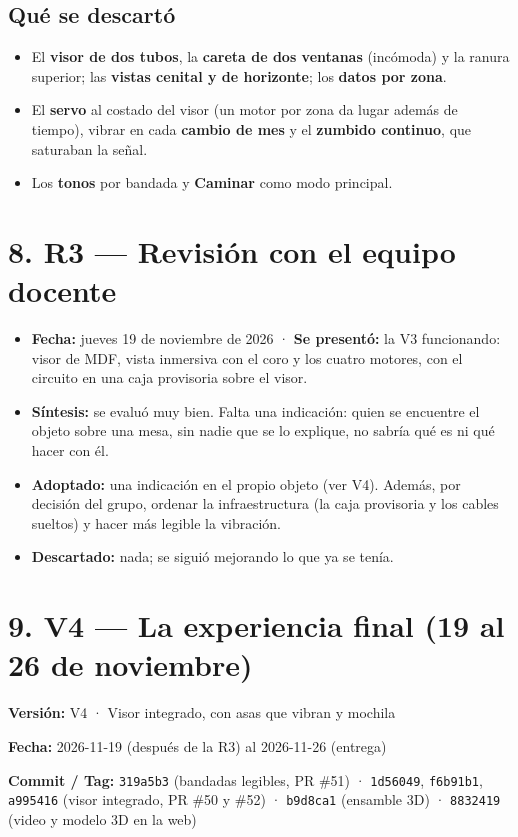 \documentclass[11pt,a4paper]{article}
\newcommand{\seccion}[1]{\clearpage\section*{#1}}
\begin{document}
\subsection*{Qué se descartó}
\begin{itemize}
\item El \textbf{visor de dos tubos}, la \textbf{careta de dos ventanas} (incómoda) y la ranura superior; las \textbf{vistas cenital y de horizonte}; los \textbf{datos por zona}.
\item El \textbf{servo} al costado del visor (un motor por zona da lugar además de tiempo), vibrar en cada \textbf{cambio de mes} y el \textbf{zumbido continuo}, que saturaban la señal.
\item Los \textbf{tonos} por bandada y \textbf{Caminar} como modo principal.
\end{itemize}
\section*{8. R3 --- Revisión con el equipo docente}
\begin{itemize}
\item \textbf{Fecha:} jueves 19 de noviembre de 2026 · \textbf{Se presentó:} la V3 funcionando: visor de MDF, vista inmersiva con el coro y los cuatro motores, con el circuito en una caja provisoria sobre el visor.
\item \textbf{Síntesis:} se evaluó muy bien. Falta una indicación: quien se encuentre el objeto sobre una mesa, sin nadie que se lo explique, no sabría qué es ni qué hacer con él.
\item \textbf{Adoptado:} una indicación en el propio objeto (ver V4). Además, por decisión del grupo, ordenar la infraestructura (la caja provisoria y los cables sueltos) y hacer más legible la vibración.
\item \textbf{Descartado:} nada; se siguió mejorando lo que ya se tenía.
\end{itemize}
\seccion{9. V4 --- La experiencia final (19 al 26 de noviembre)}
\textbf{Versión:} V4 · Visor integrado, con asas que vibran y mochila\par
\textbf{Fecha:} 2026-11-19 (después de la R3) al 2026-11-26 (entrega)\par
\textbf{Commit / Tag:} \texttt{319a5b3} (bandadas legibles, PR \#51) · \texttt{1d56049}, \texttt{f6b91b1}, \texttt{a995416} (visor integrado, PR \#50 y \#52) · \texttt{b9d8ca1} (ensamble 3D) · \texttt{8832419} (video y modelo 3D en la web)\par
\end{document}
